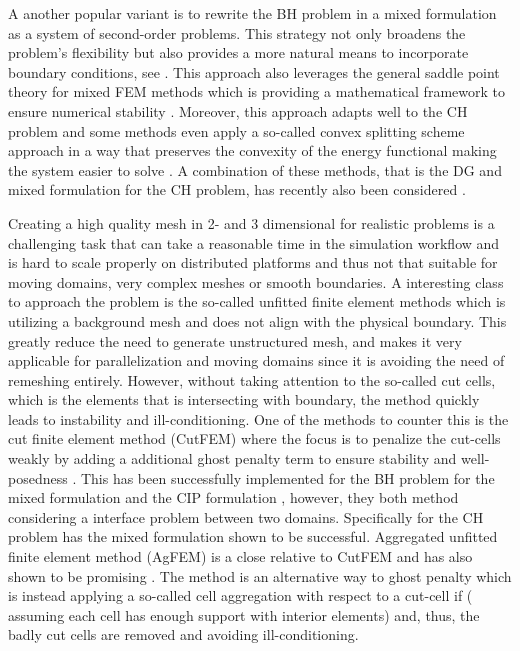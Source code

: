 A another popular variant is to rewrite the BH problem in a mixed formulation as a system of second-order problems. This strategy not only broadens the problem's flexibility but also provides a more natural means to incorporate boundary conditions,
see \cite{falk1978approximation,
ciarlet1974mixed, gudi2008mixed, cheng2000some}. This approach also leverages the general saddle point theory for mixed
FEM methods which is providing a mathematical framework to ensure numerical stability \cite{john2016finite}.
Moreover, this approach adapts well to the CH problem \cite{wells2006discontinuous,feng2004error} and some methods even apply a so-called convex splitting scheme approach in a way that preserves the convexity of the energy functional making the
system easier to solve \cite{diegel2015analysis, brenner2018robust}.
A combination of these methods, that is the DG and mixed formulation for the CH problem, has recently also been considered \cite{chave2016hybrid, medina2022stabilized}.

Creating a high quality mesh in 2- and 3 dimensional for realistic problems is a challenging task that can take a reasonable time in the simulation workflow and is hard to scale properly on distributed platforms and thus not that suitable for moving
domains, very complex meshes or smooth boundaries. A interesting class to approach the problem is the so-called unfitted finite element methods which is utilizing a background mesh and does not align with the physical boundary.
This greatly reduce the need to generate unstructured mesh, and makes it very applicable for parallelization and moving domains
since it is avoiding the need of remeshing entirely. However, without taking attention to the so-called cut cells, which is the elements that is intersecting with boundary, the method quickly leads to instability and ill-conditioning.
One of the methods to counter this is the cut finite element method (CutFEM) where the focus is to penalize the cut-cells weakly by adding a additional ghost penalty term to ensure stability and well-posedness \cite{burman2015cutfem}. This has been successfully implemented for the BH problem for the
mixed formulation \cite{cai2023nitsche} and the CIP formulation \cite{chen2023arbitrary}, however, they both method considering a interface problem between two domains. Specifically for the CH problem has the mixed formulation \cite{karatzas2021reduced} shown to be successful.
 Aggregated unfitted finite element method (AgFEM) is a close relative to CutFEM and has also shown to
be promising \cite{badia2018aggregated, badia2022linking}. The method is an alternative way to ghost penalty which is instead applying a so-called cell aggregation with respect to a cut-cell if ( assuming each cell has enough support with interior elements) and,
thus, the badly cut cells are removed and avoiding ill-conditioning.

